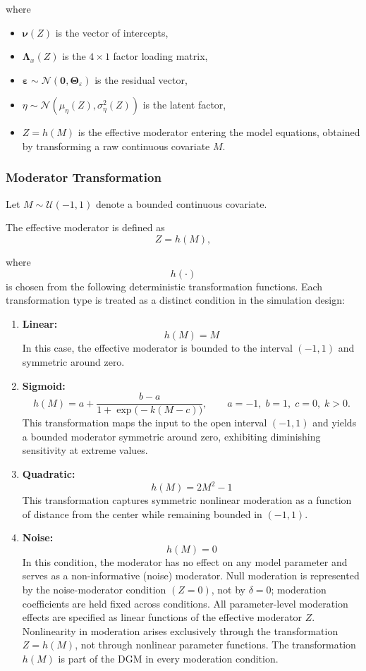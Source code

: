 \documentclass[
  man,
  floatsintext]{apa7}
\providecommand{\tightlist}{%
  \setlength{\itemsep}{0pt}\setlength{\parskip}{0pt}}
\begin{document}
where

\begin{itemize}
\tightlist
\item
  \(\boldsymbol{\nu}(Z)\) is the vector of intercepts,
\item
  \(\boldsymbol{\Lambda}_x(Z)\) is the \(4 \times 1\) factor loading
  matrix,
\item
  \(\boldsymbol{\varepsilon} \sim \mathcal{N}\!\left(\mathbf{0}, \boldsymbol{\Theta}_\varepsilon\right)\)
  is the residual vector,
\item
  \(\eta \sim \mathcal{N}\!\left(\mu_\eta(Z), \sigma^2_\eta(Z)\right)\)
  is the latent factor,
\item
  \(Z = h(M)\) is the effective moderator entering the model equations,
  obtained by transforming a raw continuous covariate \(M\).
\end{itemize}

\subsubsection{Moderator Transformation}\label{moderator-transformation}

Let \(M \sim \mathcal{U}(-1,1)\) denote a bounded continuous covariate.

The effective moderator is defined as \[
Z = h(M),
\]

where \[h(\cdot)\] is chosen from the following deterministic
transformation functions. Each transformation type is treated as a
distinct condition in the simulation design:

\begin{enumerate}
\def\labelenumi{\arabic{enumi}.}
\item
  \textbf{Linear:} \[
  h(M) = M
  \] In this case, the effective moderator is bounded to the interval
  \((-1,1)\) and symmetric around zero.
\item
  \textbf{Sigmoid:} \[
  h(M) = a + \frac{b-a}{1 + \exp\!\bigl(-k(M-c)\bigr)},
  \qquad a=-1,\; b=1,\; c=0,\; k>0.
  \] This transformation maps the input to the open interval \((-1, 1)\)
  and yields a bounded moderator symmetric around zero, exhibiting
  diminishing sensitivity at extreme values.
\item
  \textbf{Quadratic:} \[
  h(M) = 2M^2 - 1
  \] This transformation captures symmetric nonlinear moderation as a
  function of distance from the center while remaining bounded in
  \((-1,1)\).
\item
  \textbf{Noise:} \[
  h(M) = 0
  \] In this condition, the moderator has no effect on any model
  parameter and serves as a non-informative (noise) moderator. Null
  moderation is represented by the noise-moderator condition \((Z=0)\),
  not by \(\delta=0\); moderation coefficients are held fixed across
  conditions. All parameter-level moderation effects are specified as
  linear functions of the effective moderator \(Z\). Nonlinearity in
  moderation arises exclusively through the transformation \(Z = h(M)\),
  not through nonlinear parameter functions. The transformation \(h(M)\)
  is part of the DGM in every moderation condition.
\end{enumerate}
\end{document}
